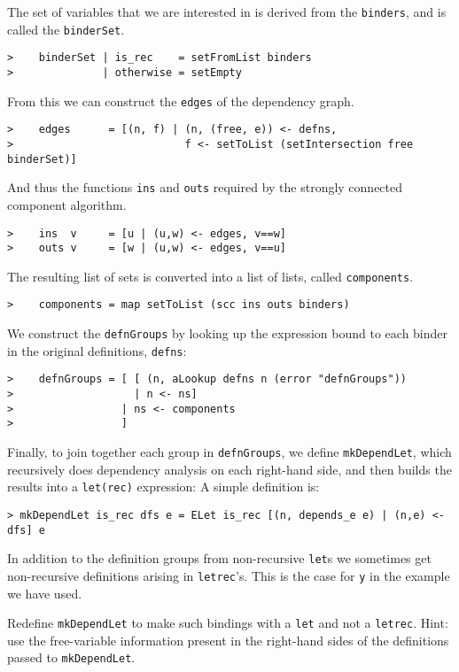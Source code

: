 \par
The set of variables that we are interested in is derived from the
\mbox{\tt binders}, and is called the \mbox{\tt binderSet}.
\begin{verbatim}
>    binderSet | is_rec    = setFromList binders
>              | otherwise = setEmpty
\end{verbatim}
\par
From this we can construct the \mbox{\tt edges} of the dependency graph.
\begin{verbatim}
>    edges      = [(n, f) | (n, (free, e)) <- defns,
>                           f <- setToList (setIntersection free binderSet)]
\end{verbatim}
And thus the functions \mbox{\tt ins} and \mbox{\tt outs} required by the strongly
connected component algorithm.
\begin{verbatim}
>    ins  v     = [u | (u,w) <- edges, v==w]
>    outs v     = [w | (u,w) <- edges, v==u]
\end{verbatim}
The resulting list of sets is converted into a list of lists, called
\mbox{\tt components}.
\begin{verbatim}
>    components = map setToList (scc ins outs binders)
\end{verbatim}
\par
We construct the \mbox{\tt defnGroups} by looking up the expression bound to
each binder in the original definitions, \mbox{\tt defns}:
\begin{verbatim}
>    defnGroups = [ [ (n, aLookup defns n (error "defnGroups"))
>                   | n <- ns]
>                 | ns <- components
>                 ]
\end{verbatim}
\par
Finally, to join together each group in \mbox{\tt defnGroups}, we define \mbox{\tt mkDependLet},
which recursively does dependency analysis on each right-hand side, and
then builds the results into a \mbox{\tt let(rec)} expression:
A simple definition is:
\begin{verbatim}
> mkDependLet is_rec dfs e = ELet is_rec [(n, depends_e e) | (n,e) <- dfs] e
\end{verbatim}
%
\begin{exercise}\label{ll:X:elet}
In addition to the definition groups from non-recursive \mbox{\tt let}s we
sometimes get non-recursive definitions arising in \mbox{\tt letrec}'s. This
is the case for \mbox{\tt y} in the example we have used.

Redefine \mbox{\tt mkDependLet} to make such bindings with a \mbox{\tt let} and not a \mbox{\tt letrec}.
Hint: use the free-variable information present in the right-hand sides of
the definitions passed to \mbox{\tt mkDependLet}.
\end{exercise}

